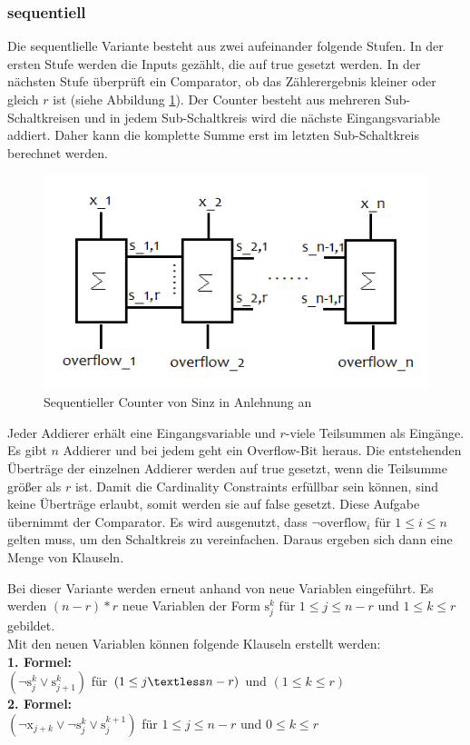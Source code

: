 \documentclass[a4,abstract=on]{scrartcl}
\begin{document}
		\subsubsection{sequentiell}
Die sequentlielle Variante besteht aus zwei aufeinander folgende Stufen. In der ersten Stufe werden die Inputs gezählt, die auf true gesetzt werden. In der nächsten Stufe überprüft ein Comparator, ob das Zählerergebnis kleiner oder gleich $r$ ist (siehe Abbildung \ref{fig:sinz_counter}). Der Counter besteht aus mehreren Sub-Schaltkreisen und in jedem Sub-Schaltkreis wird die nächste Eingangsvariable addiert. Daher kann die komplette Summe erst im letzten Sub-Schaltkreis berechnet werden. \\


\begin{figure}[H]
\centering
\includegraphics[width=\textwidth]{Sinz_seq.png}
\caption{Sequentieller Counter von Sinz in Anlehnung an \cite[][] {sinz}}
\label{fig:sinz_counter}
\end{figure}

Jeder Addierer erhält eine Eingangsvariable und $r$-viele Teilsummen als Eingänge. Es gibt $n$ Addierer und bei jedem geht ein Overflow-Bit heraus. Die entstehenden Überträge der einzelnen Addierer werden auf true gesetzt, wenn die Teilsumme größer als $r$ ist. Damit die Cardinality Constraints erfüllbar sein können, sind keine Überträge erlaubt, somit werden sie auf false gesetzt. Diese Aufgabe übernimmt der Comparator. Es wird ausgenutzt, dass $\neg \text{overflow}_i$ für $1 \leq i \leq n$ gelten muss, um den Schaltkreis zu vereinfachen. Daraus ergeben sich dann eine Menge von Klauseln.

Bei dieser Variante werden erneut anhand von \cite[][]{knuth} neue Variablen eingeführt. Es werden $(n-r)*r$ neue Variablen der Form $\text{s}_j^k$ für $1 \leq j \leq n - r$ und $1 \leq k \leq r$ gebildet. \\
Mit den neuen Variablen können folgende Klauseln erstellt werden:\\
\textbf{1. Formel:}\\
$(\neg \text{s}_j^k \vee \text{s}_{j+1}^k)$ für $(1 \leq j \textless n - r)$ und $(1 \leq k \leq r)$\\
\textbf{2. Formel:}\\
$(\neg \text{x}_{j+k} \vee \neg \text{s}_j^k \vee \text{s}_j^{k+1})$ für $1 \leq j \leq n - r$ und $0 \leq k \leq r$\\
\end{document}
